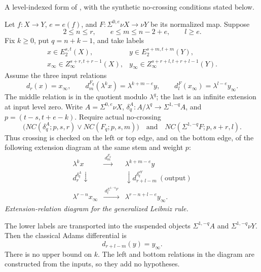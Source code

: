 \begin{theorem}
\label{sem:ProofTools:generalized-leibniz-at-level}
\label{sem:ProofTools:ss-leibniz-specialization}

A level-indexed form of \cite[Theorem 6.1]{LWX126}, with the
synthetic no-crossing conditions stated below.

Let $f:X\to Y$, $e=e(f)$, and $F:\Sigma^{0,e}\nu X\to\nu Y$
be its normalized map. Suppose
\[
2\le n\le r,\qquad e\le m\le n-2+e,\qquad l\ge e.
\]
Fix $k\ge0$, put $q=n+k-1$, and take labels
\[
\begin{array}{ll}
x\in E_2^{s,t}(X),&y\in E_2^{s+m,t+m}(Y),\\
x_\infty\in Z_\infty^{s+r,t+r-1}(X),&
y_\infty\in Z_\infty^{s+r+l,t+r+l-1}(Y).
\end{array}
\]
Assume the three input relations
\[
d_r(x)=x_\infty,\qquad
 d_m^{F_q}(\lambda^kx)=\lambda^{k+m-e}y,\qquad
 d_l^F(x_\infty)=\lambda^{l-e}y_\infty.
\]
The middle relation is in the quotient modulo $\lambda^q$;
the last is an infinite extension at input level zero.
Write $A=\Sigma^{0,e}\nu X$, $\delta_q^A:A/\lambda^q\to\Sigma^{1,-q}A$,
and $p=(t-s,t+e-k)$. Require actual no-crossing
\[
\bigl(NC(\delta_q^A;p,s,r)\lor NC(F_q;p,s,m)\bigr)
\quad\text{and}\quad NC(\Sigma^{1,-q}F;p,s+r,l).
\]
Thus crossing is checked on the left or top edge, and on the bottom edge,
of the following extension diagram at the same stem and weight $p$:
\[
\begin{array}{ccc}
\lambda^kx&\xrightarrow{\ d_m^{F_q}\ }&\lambda^{k+m-e}y\\
{\scriptstyle d_r^{\delta_q^A}}\downarrow&&
\downarrow{\scriptstyle d_{r+l-m}^{\delta_q^{\nu Y}}\ (\mathrm{output})}\\
\lambda^{r-n}x_\infty&\xrightarrow{\ d_l^{\Sigma^{1,-q}F}\ }&
\lambda^{r-n+l-e}y_\infty.
\end{array}
\]
\textit{Extension-relation diagram for the generalized Leibniz rule.}

The lower labels are transported into the suspended objects
$\Sigma^{1,-q}A$ and $\Sigma^{1,-q}\nu Y$.
Then the classical Adams differential is
\[
\boxed{d_{r+l-m}(y)=y_\infty.}
\]
There is no upper bound on $k$. The left and bottom relations in the
diagram are constructed from the inputs, so they add no hypotheses.


\end{theorem}
